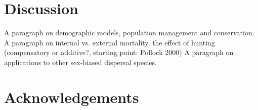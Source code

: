 \section{Discussion}
A paragraph on demographic models, population management and conservation.
A paragraph on internal vs. external mortality, the effect of hunting (compensatory or additive?, starting point: Pollock 2000)
A paragraph on applications to other sex-biased dispersal species.	 
\section{Acknowledgements}